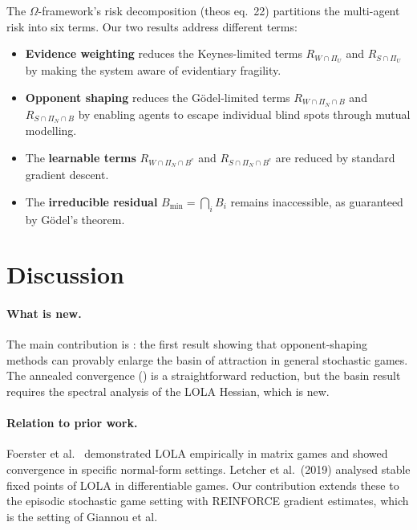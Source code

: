 \documentclass[11pt,a4paper]{article}
\begin{document}
The $\Omega$-framework's risk decomposition (theos eq.\ 22) partitions the multi-agent risk into six terms. Our two results address different terms:
\begin{itemize}
    \item \textbf{Evidence weighting} reduces the Keynes-limited terms $R_{W \cap \Pi_U}$ and $R_{S \cap \Pi_U}$ by making the system aware of evidentiary fragility.
    \item \textbf{Opponent shaping} reduces the Gödel-limited terms $R_{W \cap \Pi_N \cap B}$ and $R_{S \cap \Pi_N \cap B}$ by enabling agents to escape individual blind spots through mutual modelling.
    \item The \textbf{learnable terms} $R_{W \cap \Pi_N \cap B^c}$ and $R_{S \cap \Pi_N \cap B^c}$ are reduced by standard gradient descent.
    \item The \textbf{irreducible residual} $B_{\min} = \bigcap_i B_i$ remains inaccessible, as guaranteed by Gödel's theorem.
\end{itemize}


\section{Discussion}
\label{sec:discussion}

\paragraph{What is new.} The main contribution is : the first result showing that opponent-shaping methods can provably enlarge the basin of attraction in general stochastic games. The annealed convergence () is a straightforward reduction, but the basin result requires the spectral analysis of the LOLA Hessian, which is new.

\paragraph{Relation to prior work.} Foerster et al.\ \cite{foerster2018} demonstrated LOLA empirically in matrix games and showed convergence in specific normal-form settings. Letcher et al.\ (2019) analysed stable fixed points of LOLA in differentiable games. Our contribution extends these to the episodic stochastic game setting with REINFORCE gradient estimates, which is the setting of Giannou et al.
\end{document}
